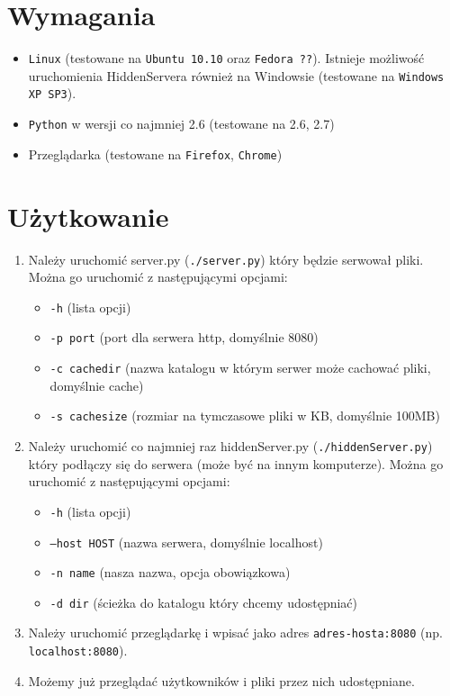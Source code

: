 \documentclass[a4paper,notitlepage]{article}
\begin{document}
\pagestyle{fancy}
\tableofcontents
\section{Wymagania}
\begin{itemize}
\item \texttt{Linux} (testowane na \texttt{Ubuntu 10.10} oraz 
	\texttt{Fedora ??}).
	Istnieje możliwość uruchomienia HiddenServera również na Windowsie 
	(testowane na \texttt{Windows XP SP3}).
\item \texttt{Python} w wersji co najmniej 2.6 (testowane na 2.6, 2.7)
\item Przeglądarka (testowane na \texttt{Firefox}, \texttt{Chrome})
\end{itemize}

\section{Użytkowanie}
\begin{enumerate}
\item Należy uruchomić server.py (\texttt{./server.py}) który będzie serwował pliki. Można go uruchomić z następującymi opcjami:
    \begin{itemize}
    \item \texttt{-h} (lista opcji)
    \item \texttt{-p port} (port dla serwera http, domyślnie 8080)
    \item \texttt{-c cachedir} (nazwa katalogu w którym serwer może cachować pliki, domyślnie cache)
    \item \texttt{-s cachesize} (rozmiar na tymczasowe pliki w KB, domyślnie 100MB)
    \end{itemize}
\item Należy uruchomić co najmniej raz hiddenServer.py (\texttt{./hiddenServer.py}) który podłączy się do serwera (może być na innym komputerze). Można go uruchomić z następującymi opcjami:
    \begin{itemize}
    \item \texttt{-h} (lista opcji)
    \item \texttt{--host HOST} (nazwa serwera, domyślnie localhost)
    \item \texttt{-n name} (nasza nazwa, opcja obowiązkowa)
    \item \texttt{-d dir} (ścieżka do katalogu który chcemy udostępniać)
    \end{itemize}
\item Należy uruchomić przeglądarkę i wpisać jako adres \texttt{adres-hosta:8080} (np. \texttt{localhost:8080}).
\item Możemy już przeglądać użytkowników i pliki przez nich udostępniane.
\end{enumerate}


   
\end{document}

